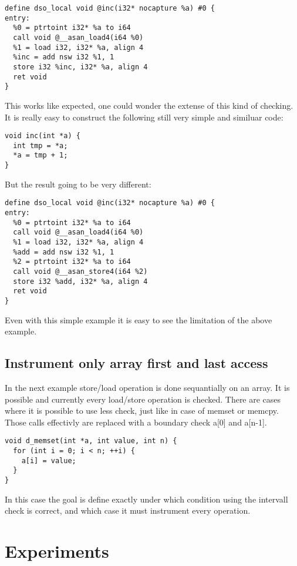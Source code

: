 \documentclass[letterpaper, 10 pt]{llncs}
\begin{document}
\begin{verbatim}
define dso_local void @inc(i32* nocapture %a) #0 {
entry:
  %0 = ptrtoint i32* %a to i64
  call void @__asan_load4(i64 %0)
  %1 = load i32, i32* %a, align 4
  %inc = add nsw i32 %1, 1
  store i32 %inc, i32* %a, align 4
  ret void
}
\end{verbatim}

This works like expected, one could wonder the extense of this kind of checking. It is really easy to construct the following still very simple and similuar code:

\begin{verbatim}
void inc(int *a) {
  int tmp = *a;
  *a = tmp + 1;
}
\end{verbatim}

But the result going to be very different:

\begin{verbatim}
define dso_local void @inc(i32* nocapture %a) #0 {
entry:
  %0 = ptrtoint i32* %a to i64
  call void @__asan_load4(i64 %0)
  %1 = load i32, i32* %a, align 4
  %add = add nsw i32 %1, 1
  %2 = ptrtoint i32* %a to i64
  call void @__asan_store4(i64 %2)
  store i32 %add, i32* %a, align 4
  ret void
}
\end{verbatim}

Even with this simple example it is easy to see the limitation of the above example.

\subsection{Instrument only array first and last access}

In the next example store/load operation is done sequantially on an array. It is possible and currently every load/store operation is checked. There are cases where it is possible to use less check, just like in case of memset or memcpy. Those calls effectivly are replaced with a boundary check a[0] and a[n-1].
\begin{verbatim}
void d_memset(int *a, int value, int n) {
  for (int i = 0; i < n; ++i) {
    a[i] = value;
  }
}
\end{verbatim}
In this case the goal is define exactly under which condition using the intervall check is correct, and which case it must instrument every operation.


\section{Experiments}
\end{document}
